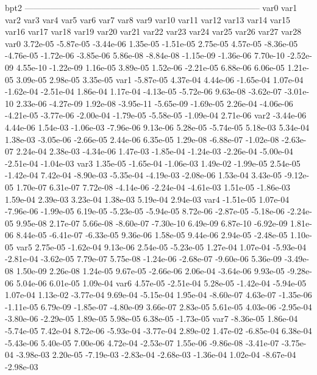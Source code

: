 bpt2
-----------------------------------------------------------------------------------
var0 var1 var2 var3 var4 var5 var6 var7 var8 var9 var10 var11 var12 var13 var14 var15 var16 var17 var18 var19 var20 var21 var22 var23 var24 var25 var26 var27 var28 
var0  3.72e-05 -5.87e-05 -3.44e-06  1.35e-05 -1.51e-05  2.75e-05  4.57e-05 -8.36e-05 -4.76e-05 -1.72e-06 -3.85e-06  5.86e-08 -8.84e-08 -1.15e-09 -1.36e-06  7.70e-10 -2.52e-09  4.55e-10 -1.22e-09  1.16e-05  3.89e-05  1.52e-06 -2.21e-05  6.88e-06  6.06e-05  1.21e-05  3.09e-05  2.98e-05  3.35e-05
var1 -5.87e-05  4.37e-04  4.44e-06 -1.65e-04  1.07e-04 -1.62e-04 -2.51e-04  1.86e-04  1.17e-04 -4.13e-05 -5.72e-06  9.63e-08 -3.62e-07 -3.01e-10  2.33e-06 -4.27e-09  1.92e-08 -3.95e-11 -5.65e-09 -1.69e-05  2.26e-04 -4.06e-06 -4.21e-05 -3.77e-06 -2.00e-04 -1.79e-05 -5.58e-05 -1.09e-04  2.71e-06
var2 -3.44e-06  4.44e-06  1.54e-03 -1.06e-03 -7.96e-06  9.13e-06  5.28e-05 -5.74e-05  5.18e-03  5.34e-04  1.38e-03 -3.05e-06 -2.66e-05  2.44e-06  6.35e-05  1.29e-08 -6.88e-07 -1.02e-08 -2.63e-07  2.24e-04  2.38e-03 -4.34e-06  1.47e-03 -1.85e-04 -1.24e-03 -2.26e-04 -5.00e-04 -2.51e-04 -1.04e-03
var3  1.35e-05 -1.65e-04 -1.06e-03  1.49e-02 -1.99e-05  2.54e-05 -1.42e-04  7.42e-04 -8.90e-03 -5.35e-04 -4.19e-03 -2.08e-06  1.53e-04  3.43e-05 -9.12e-05  1.70e-07  6.31e-07  7.72e-08 -4.14e-06 -2.24e-04 -4.61e-03  1.51e-05 -1.86e-03  1.59e-04  2.39e-03  3.23e-04  1.38e-03  5.19e-04  2.94e-03
var4 -1.51e-05  1.07e-04 -7.96e-06 -1.99e-05  6.19e-05 -5.23e-05 -5.94e-05  8.72e-06 -2.87e-05 -5.18e-06 -2.24e-05  9.95e-08  2.17e-07  5.66e-08 -8.60e-07 -7.30e-10  6.49e-09  6.87e-10 -6.92e-09  1.81e-06  8.44e-05 -6.41e-07 -6.33e-05  9.36e-06  1.58e-05  9.44e-06  2.94e-05 -2.48e-05  1.10e-05
var5  2.75e-05 -1.62e-04  9.13e-06  2.54e-05 -5.23e-05  1.27e-04  1.07e-04 -5.93e-04 -2.81e-04 -3.62e-05  7.79e-07  5.75e-08 -1.24e-06 -2.68e-07 -9.60e-06  5.36e-09 -3.49e-08  1.50e-09  2.26e-08  1.24e-05  9.67e-05 -2.66e-06  2.06e-04 -3.64e-06  9.93e-05 -9.28e-06  5.04e-06  6.01e-05  1.09e-04
var6  4.57e-05 -2.51e-04  5.28e-05 -1.42e-04 -5.94e-05  1.07e-04  1.13e-02 -3.77e-04  9.69e-04 -5.15e-04  1.95e-04 -8.60e-07  4.63e-07 -1.35e-06 -1.11e-05  6.79e-09 -1.85e-07 -4.80e-09  3.66e-07  2.83e-05  5.61e-05  4.03e-06 -2.95e-04 -3.80e-06 -2.29e-05  1.89e-05  5.98e-05  6.38e-05 -1.73e-05
var7 -8.36e-05  1.86e-04 -5.74e-05  7.42e-04  8.72e-06 -5.93e-04 -3.77e-04  2.89e-02  1.47e-02 -6.85e-04  6.38e-04 -5.43e-06  5.40e-05  7.00e-06  4.72e-04 -2.53e-07  1.55e-06 -9.86e-08 -3.41e-07 -3.75e-04 -3.98e-03  2.20e-05 -7.19e-03 -2.83e-04 -2.68e-03 -1.36e-04  1.02e-04 -8.67e-04 -2.98e-03
